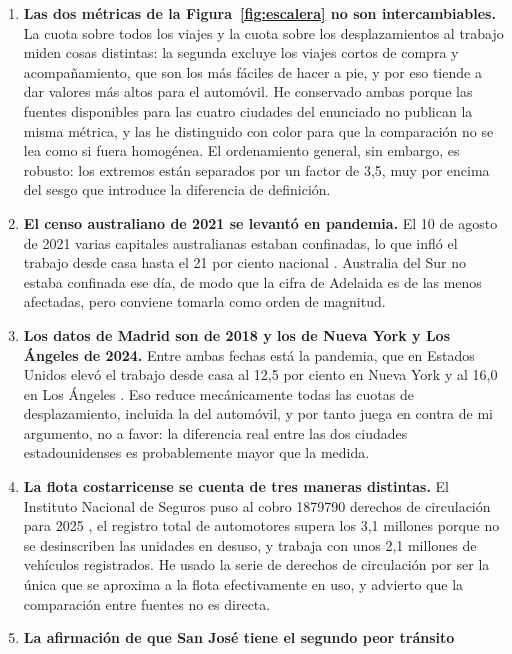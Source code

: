 \documentclass[11pt,letterpaper]{article}
\begin{document}
\begin{enumerate}
  \item \textbf{Las dos métricas de la Figura~\ref{fig:escalera} no son
    intercambiables.} La cuota sobre todos los viajes y la cuota sobre los
    desplazamientos al trabajo miden cosas distintas: la segunda excluye los
    viajes cortos de compra y acompañamiento, que son los más fáciles de hacer
    a pie, y por eso tiende a dar valores más altos para el automóvil. He
    conservado ambas porque las fuentes disponibles para las cuatro ciudades
    del enunciado no publican la misma métrica, y las he distinguido con color
    para que la comparación no se lea como si fuera homogénea. El ordenamiento
    general, sin embargo, es robusto: los extremos están separados por un
    factor de 3,5, muy por encima del sesgo que introduce la diferencia de
    definición.
  \item \textbf{El censo australiano de 2021 se levantó en pandemia.} El 10 de
    agosto de 2021 varias capitales australianas estaban confinadas, lo que
    infló el trabajo desde casa hasta el 21 por ciento nacional
    \parencite{abs2021}. Australia del Sur no estaba confinada ese día, de modo
    que la cifra de Adelaida es de las menos afectadas, pero conviene tomarla
    como orden de magnitud.
  \item \textbf{Los datos de Madrid son de 2018 y los de Nueva York y Los
    Ángeles de 2024.} Entre ambas fechas está la pandemia, que en Estados
    Unidos elevó el trabajo desde casa al 12,5 por ciento en Nueva York y al
    16,0 en Los Ángeles \parencite{acs2024}. Eso reduce mecánicamente todas las
    cuotas de desplazamiento, incluida la del automóvil, y por tanto juega en
    contra de mi argumento, no a favor: la diferencia real entre las dos
    ciudades estadounidenses es probablemente mayor que la medida.
  \item \textbf{La flota costarricense se cuenta de tres maneras distintas.}
    El Instituto Nacional de Seguros puso al cobro \num{1879790} derechos de
    circulación para 2025 \parencite{observador2025}, el registro total de
    automotores supera los 3,1 millones porque no se desinscriben las unidades
    en desuso, y \textcite{allen2026} trabaja con unos 2,1 millones de
    vehículos registrados. He usado la serie de derechos de circulación por ser
    la única que se aproxima a la flota efectivamente en uso, y advierto que la
    comparación entre fuentes no es directa.
  \item \textbf{La afirmación de que San José tiene el segundo peor tránsito
}
\end{enumerate}
\end{document}
